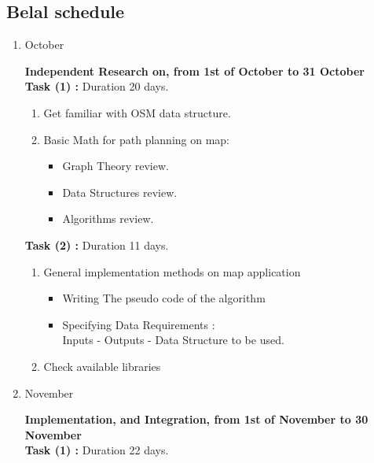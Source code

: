 \documentclass[a4paper, 12pt, english]{book}
\begin{document}
\subsection{Belal schedule}
\begin{enumerate}
\item {{\Large October\par}}
\textbf{Independent Research on, from 1st of October to 31 October}\\
\textbf{Task (1) :} Duration 20 days.
\begin{enumerate}
\item {Get familiar with OSM data structure.}
\item {Basic Math for path planning on map:}
\begin{itemize}
    \item {Graph Theory review.}
    \item {Data Structures review.}
    \item {Algorithms review.} 
\end{itemize}
\end{enumerate}
\textbf{Task (2) :} Duration 11 days.
\begin{enumerate}
\item {General implementation methods on map application}
\begin{itemize}
    \item{Writing The pseudo code of the algorithm}
    \item{Specifying Data Requirements :\\
              Inputs - Outputs - Data Structure to be used.}
\end{itemize}
\item {Check available libraries}

\end{enumerate}
\item {{\Large November\par}}
\textbf{Implementation, and Integration, from 1st of November to 30 November}\\
\textbf{Task (1) :} Duration 22 days.
\begin{enumerate}


\end{enumerate}
\end{enumerate}
\end{document}
